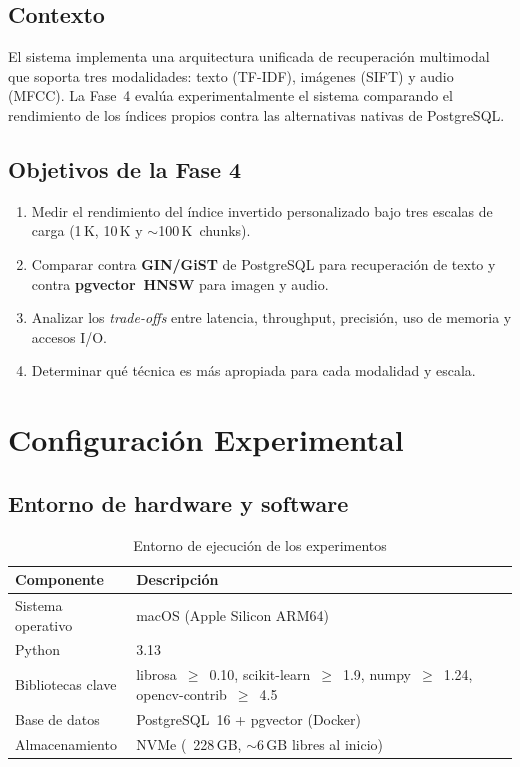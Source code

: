 \documentclass[12pt,a4paper]{article}
\begin{document}
\subsection{Contexto}

El sistema implementa una arquitectura unificada de recuperación multimodal
que soporta tres modalidades: texto (TF-IDF), imágenes (SIFT) y audio (MFCC).
La Fase~4 evalúa experimentalmente el sistema comparando el rendimiento de los
índices propios contra las alternativas nativas de PostgreSQL.

\subsection{Objetivos de la Fase 4}

\begin{enumerate}[leftmargin=*, label=\arabic*.]
  \item Medir el rendimiento del índice invertido personalizado bajo tres
        escalas de carga (1\,K, 10\,K y $\sim$100\,K~chunks).
  \item Comparar contra \textbf{GIN/GiST} de PostgreSQL para recuperación
        de texto y contra \textbf{pgvector~HNSW} para imagen y audio.
  \item Analizar los \emph{trade-offs} entre latencia, throughput, precisión,
        uso de memoria y accesos I/O.
  \item Determinar qué técnica es más apropiada para cada modalidad y escala.
\end{enumerate}

\section{Configuración Experimental}

\subsection{Entorno de hardware y software}

\begin{table}[H]
  \centering
  \caption{Entorno de ejecución de los experimentos}
  \begin{tabular}{ll}
    \toprule
    \textbf{Componente} & \textbf{Descripción} \\
    \midrule
    Sistema operativo   & macOS (Apple Silicon ARM64) \\
    Python              & 3.13 \\
    Bibliotecas clave   & librosa~$\geq$~0.10, scikit-learn~$\geq$~1.9,
                          numpy~$\geq$~1.24, opencv-contrib~$\geq$~4.5 \\
    Base de datos       & PostgreSQL~16 + pgvector (Docker) \\
    Almacenamiento      & NVMe (~228\,GB, $\sim$6\,GB libres al inicio) \\
    \bottomrule
  \end{tabular}
\end{table}
\end{document}

